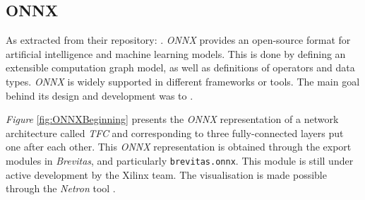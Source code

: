 
\subsection{ONNX}

As extracted from their repository: . \emph{ONNX} provides an open-source format for artificial intelligence and machine learning models. This is done by defining an extensible computation graph model, as well as definitions of operators and data types. \emph{ONNX} is widely supported in different frameworks or tools. The main goal behind its design and development was to  \cite{ONNXRepo}.

\emph{Figure} \ref{fig:ONNXBeginning} presents the \emph{ONNX} representation of a network architecture called \emph{TFC} and corresponding to three fully-connected layers put one after each other. This \emph{ONNX} representation is obtained through the export modules in \emph{Brevitas}, and particularly \texttt{brevitas.onnx}. This module is still under active development by the Xilinx team. The visualisation is made possible through the \emph{Netron} tool \cite{NetronRepo}.

